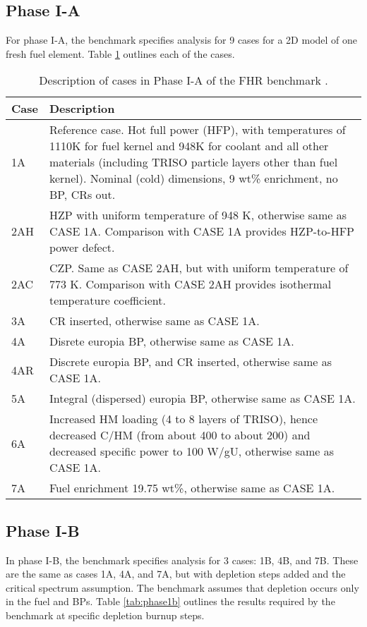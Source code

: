 \subsection{Phase I-A}
For phase I-A, the benchmark specifies analysis for 9 cases for a 2D model of 
one fresh fuel element. 
Table \ref{tab:phase1a-cases} outlines each of the cases. 
\begin{table}[H]
    \centering
    \onehalfspacing
    \caption{Description of cases in Phase I-A of the \gls{FHR} benchmark \cite{noauthor_fluoride_nodate}.}
	\label{tab:phase1a-cases}
    \footnotesize
    \begin{tabular}{p{}|p{}}
    \hline 
    \textbf{Case} & \textbf{Description} \\
    \hline
    1A & Reference case. Hot full power (HFP), with temperatures of 1110K for 
    fuel kernel and 948K for coolant and all other materials (including TRISO 
    particle layers other than fuel kernel). Nominal (cold) dimensions, 
    9 wt\% enrichment, no \gls{BP}, \glspl{CR} out.\\
    \hline
    2AH & \gls{HZP} with uniform temperature of 948 K, 
    otherwise same as CASE 1A. Comparison with CASE 1A provides HZP-to-HFP power 
    defect.\\
    \hline 
    2AC & \gls{CZP}. Same as CASE 2AH, but with uniform temperature 
    of 773 K. Comparison with CASE 2AH provides isothermal temperature coefficient.\\
    \hline
    3A & \gls{CR} inserted, otherwise same as CASE 1A. \\
    \hline
    4A & Disrete europia \gls{BP}, otherwise same as CASE 1A.\\
    \hline
    4AR & Discrete europia \gls{BP}, and \gls{CR} inserted, otherwise same as 
    CASE 1A. \\
    \hline
    5A & Integral (dispersed) europia \gls{BP}, otherwise same as CASE 1A. \\
    \hline
    6A & Increased \gls{HM} loading (4 to 8 layers of \gls{TRISO}), hence decreased C/HM 
    (from about 400 to about 200) and decreased specific power to 100 W/gU, 
    otherwise same as CASE 1A.\\
    \hline 
    7A & Fuel enrichment 19.75 wt\%, otherwise same as CASE 1A.\\
    \hline 
    \end{tabular}
\end{table}

\subsection{Phase I-B}
In phase I-B, the benchmark specifies analysis for 3 cases: 1B, 4B, and 7B. 
These are the same as cases 1A, 4A, and 7A, but with depletion steps added and
the critical spectrum assumption. 
The benchmark assumes that depletion occurs only in the fuel and \glspl{BP}. 
Table \ref{tab:phase1b} outlines the results required by the benchmark at specific 
depletion burnup steps. 

